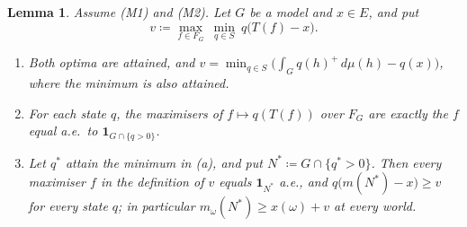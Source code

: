 \documentclass[11pt]{article}
\newcommand{\one}{\mathbf{1}}
\theoremstyle{plain}
\newtheorem{lemma}[theorem]{Lemma}
\theoremstyle{definition}
\theoremstyle{remark}
\begin{document}
\begin{lemma}\label{lem:minimax}
Assume (M1) and (M2). Let $G$ be a model and $x\in E$, and put
\[
  v\coloneqq\max_{f\in F_G}\ \min_{q\in S}\ q\bigl(T(f)-x\bigr).
\]
\begin{enumerate}[label=(\alph*)]
  \item Both optima are attained, and $v=\min_{q\in S}\bigl(\int_Gq(h)^+\,d\mu(h)-q(x)
  \bigr)$, where the minimum is also attained.
  \item For each state $q$, the maximisers of $f\mapsto q(T(f))$ over $F_G$ are exactly the
  $f$ equal a.e.\ to $\one_{G\cap\{q>0\}}$.
  \item Let $q^\ast$ attain the minimum in (a), and put $N^\ast\coloneqq G\cap\{q^\ast>0\}$.
  Then every maximiser $f$ in the definition of $v$ equals $\one_{N^\ast}$ a.e., and
  $q\bigl(m(N^\ast)-x\bigr)\ge v$ for every state $q$; in particular $m_\omega(N^\ast)\ge
  x(\omega)+v$ at every world.
\end{enumerate}
\end{lemma}
\end{document}
